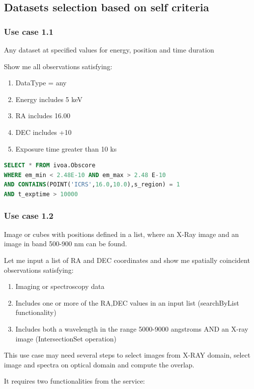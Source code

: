 \documentclass[11pt,a4paper]{ivoa}
\begin{document}
\subsection{Datasets selection based on self criteria}
\subsubsection{Use case 1.1}
Any dataset at specified values for energy, position and time duration

Show me all observations satisfying:

\begin{enumerate}
\item DataType = any
\item Energy includes 5 keV
\item RA includes 16.00
\item DEC includes +10
\item Exposure time greater than 10 ks
\end{enumerate}

\begin{lstlisting}[language=SQL,flexiblecolumns=true]
SELECT * FROM ivoa.Obscore
WHERE em_min < 2.48E-10 AND em_max > 2.48 E-10
AND CONTAINS(POINT('ICRS',16.0,10.0),s_region) = 1
AND t_exptime > 10000
\end{lstlisting}

\subsubsection{Use case 1.2}
Image or cubes with positions defined in a list, where an X-Ray image and an image in band 500-900 nm can be found.

Let me input a list of RA and DEC coordinates and show me spatially coincident observations satisfying:

\begin{enumerate}
\item Imaging or spectroscopy data
\item Includes one or more of the RA,DEC values in an input list (searchByList functionality)
\item Includes both a wavelength in the range 5000-9000 angstroms AND an X-ray image (IntersectionSet operation)
\end{enumerate}
This use case may need several steps to select images from X-RAY domain, select image and spectra on optical domain and
compute the overlap.

It requires two functionalities from the service:
\end{document}
